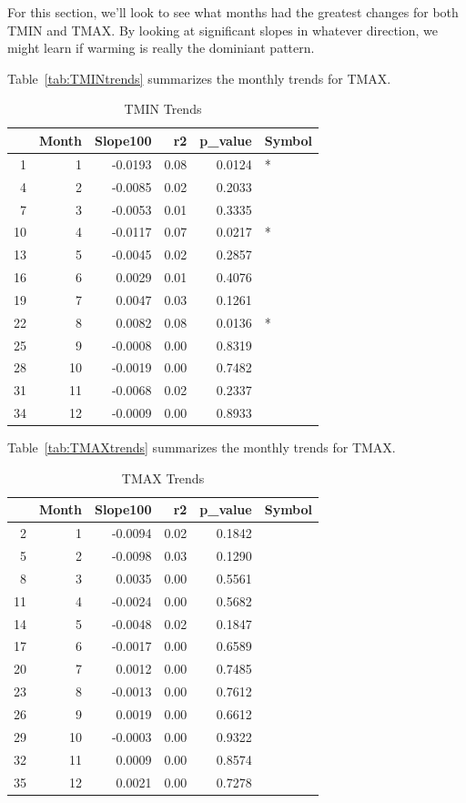 \documentclass{article}\usepackage[]{graphicx}\usepackage[]{color}
\begin{document}
For this section, we'll look to see what months had the greatest changes for both TMIN and TMAX. By looking at significant slopes in whatever direction, we might learn if warming is really the dominiant pattern. 

Table~\ref{tab:TMINtrends} summarizes the monthly trends for TMAX.

\begin{table}[ht]
\centering
\begin{tabular}{rrrrrl}
  \hline
 & Month & Slope100 & r2 & p\_value & Symbol \\ 
  \hline
1 & 1 & -0.0193 & 0.08 & 0.0124 & * \\ 
  4 & 2 & -0.0085 & 0.02 & 0.2033 &  \\ 
  7 & 3 & -0.0053 & 0.01 & 0.3335 &  \\ 
  10 & 4 & -0.0117 & 0.07 & 0.0217 & * \\ 
  13 & 5 & -0.0045 & 0.02 & 0.2857 &  \\ 
  16 & 6 & 0.0029 & 0.01 & 0.4076 &  \\ 
  19 & 7 & 0.0047 & 0.03 & 0.1261 &  \\ 
  22 & 8 & 0.0082 & 0.08 & 0.0136 & * \\ 
  25 & 9 & -0.0008 & 0.00 & 0.8319 &  \\ 
  28 & 10 & -0.0019 & 0.00 & 0.7482 &  \\ 
  31 & 11 & -0.0068 & 0.02 & 0.2337 &  \\ 
  34 & 12 & -0.0009 & 0.00 & 0.8933 &  \\ 
   \hline
\end{tabular}
\caption{TMIN Trends} 
\end{table}


Table~\ref{tab:TMAXtrends} summarizes the monthly trends for TMAX.
\begin{table}[ht]
\centering
\begin{tabular}{rrrrrl}
  \hline
 & Month & Slope100 & r2 & p\_value & Symbol \\ 
  \hline
2 & 1 & -0.0094 & 0.02 & 0.1842 &  \\ 
  5 & 2 & -0.0098 & 0.03 & 0.1290 &  \\ 
  8 & 3 & 0.0035 & 0.00 & 0.5561 &  \\ 
  11 & 4 & -0.0024 & 0.00 & 0.5682 &  \\ 
  14 & 5 & -0.0048 & 0.02 & 0.1847 &  \\ 
  17 & 6 & -0.0017 & 0.00 & 0.6589 &  \\ 
  20 & 7 & 0.0012 & 0.00 & 0.7485 &  \\ 
  23 & 8 & -0.0013 & 0.00 & 0.7612 &  \\ 
  26 & 9 & 0.0019 & 0.00 & 0.6612 &  \\ 
  29 & 10 & -0.0003 & 0.00 & 0.9322 &  \\ 
  32 & 11 & 0.0009 & 0.00 & 0.8574 &  \\ 
  35 & 12 & 0.0021 & 0.00 & 0.7278 &  \\ 
   \hline
\end{tabular}
\caption{TMAX Trends} 
\end{table}
\end{document}
